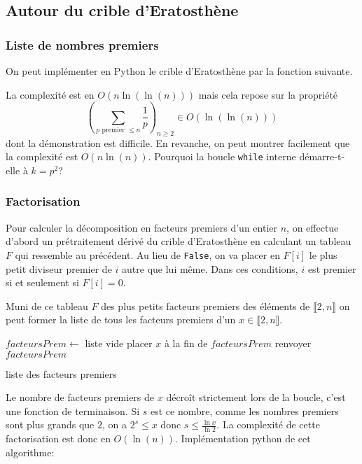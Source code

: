 \subsection{Autour du crible d'Eratosthène}
\subsubsection{Liste de nombres premiers}
On peut implémenter en Python le crible d'Eratosthène par la fonction suivante.

La complexité est en $O(n\ln(\ln(n)))$ mais cela repose sur la propriété
\begin{displaymath}
  \left( \sum_{p\text{ premier }\leq n} \frac{1}{p}\right)_{n\geq 2} \in O(\ln(\ln(n))) 
\end{displaymath}
dont la démonstration est difficile. En revanche, on peut montrer facilement que la complexité est $O(n\ln(n))$.\newline
Pourquoi la boucle \texttt{while} interne démarre-t-elle à $k=p^2$?

\subsubsection{Factorisation}
Pour calculer la décomposition en facteurs premiers d'un entier $n$, on effectue d'abord un prétraitement dérivé du crible d'Eratosthène en calculant un tableau $F$ qui ressemble au précédent. Au lieu de \texttt{False}, on va placer en $F[i]$ le plus petit diviseur premier de $i$ autre que lui même. Dans ces conditions, $i$ est premier si et seulement si $F[i]=0$.

Muni de ce tableau $F$ des plus petits facteurs premiers des éléments de $\llbracket 2,n\rrbracket$ on peut former la liste de tous les facteurs premiers d'un $x\in  \llbracket 2,n\rrbracket$.

\begin{algorithm}
  $facteursPrem \leftarrow$ liste vide \;
  placer $x$ à la fin de $facteursPrem$\;
  renvoyer $facteursPrem$ \;
  \caption{liste des facteurs premiers}
  \label{complexite_4}
\end{algorithm}
Le nombre de facteurs premiers de $x$ décroît strictement lors de la boucle, c'est une fonction de terminaison. Si $s$ est ce nombre, comme les nombres premiers sont plus grands que $2$, on a $2^s \leq x$ donc $s\leq \frac{\ln x}{\ln 2}$. La complexité de cette factorisation est donc en $O(\ln(n))$.\newline
Implémentation python de cet algorithme:



